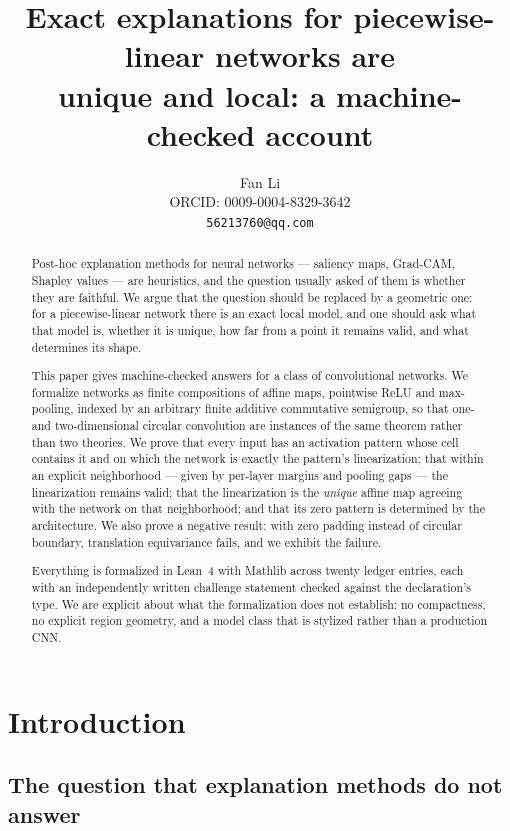 \documentclass[11pt]{article}
\title{Exact explanations for piecewise-linear networks are\\
unique and local: a machine-checked account}
\author{Fan Li\\[8pt]
{\small ORCID: 0009-0004-8329-3642}\\[2pt]
{\small \texttt{56213760@qq.com}}}
\date{}
\newcommand{\Lean}{Lean}
\begin{document}
\maketitle

\begin{abstract}
Post-hoc explanation methods for neural networks --- saliency maps, Grad-CAM,
Shapley values --- are heuristics, and the question usually asked of them is
whether they are faithful. We argue that the question should be replaced by a
geometric one: for a piecewise-linear network there is an exact local model,
and one should ask what that model is, whether it is unique, how far from a
point it remains valid, and what determines its shape.

This paper gives machine-checked answers for a class of convolutional
networks. We formalize networks as finite compositions of affine maps,
pointwise ReLU and max-pooling, indexed by an arbitrary finite additive
commutative semigroup, so that one- and two-dimensional circular convolution
are instances of the same theorem rather than two theories. We prove that every
input has an activation pattern whose cell contains it and on which the network
is exactly the pattern's linearization; that within an explicit neighborhood ---
given by per-layer margins and pooling gaps --- the linearization remains valid;
that the linearization is the \emph{unique} affine map agreeing with the
network on that neighborhood; and that its zero pattern is determined by the
architecture. We also prove a negative result: with zero padding instead of
circular boundary, translation equivariance fails, and we exhibit the failure.

Everything is formalized in \Lean{}~4 with Mathlib across twenty ledger entries,
each with an independently written challenge statement checked against the
declaration's type. We are explicit about what the formalization does not
establish: no compactness, no explicit region geometry, and a model class that
is stylized rather than a production CNN.

\end{abstract}

\tableofcontents

\section{Introduction}

\subsection{The question that explanation methods do not answer}
\end{document}
